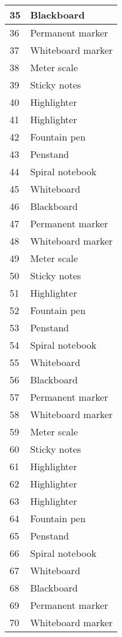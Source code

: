 \documentclass{article}
\begin{document}
\begin{longtable}{|l|l|}
		\hline
		35 & Blackboard \\
		\hline
		36 & Permanent marker \\
		\hline
		37 & Whiteboard marker \\
		\hline
		38 & Meter scale \\
		\hline
		39 & Sticky notes \\
		\hline
		40 & Highlighter \\
		\hline
		41 & Highlighter \\
		\hline
		42 & Fountain pen \\
		\hline
		43 & Penstand \\
		\hline
		44 & Spiral notebook \\
		\hline
		45 & Whiteboard \\
		\hline
		46 & Blackboard \\
		\hline
		47 & Permanent marker \\
		\hline
		48 & Whiteboard marker \\
		\hline
		49 & Meter scale \\
		\hline
		50 & Sticky notes \\
		\hline
		51 & Highlighter \\
		\hline
		52 & Fountain pen \\
		\hline
		53 & Penstand \\
		\hline
		54 & Spiral notebook \\
		\hline
		55 & Whiteboard \\
		\hline
		56 & Blackboard \\
		\hline
		57 & Permanent marker \\
		\hline
		58 & Whiteboard marker \\
		\hline
		59 & Meter scale \\
		\hline
		60 & Sticky notes \\
		\hline
		61 & Highlighter \\
		\hline
		62 & Highlighter \\
		\hline
		63 & Highlighter \\
		\hline
		64 & Fountain pen \\
		\hline
		65 & Penstand \\
		\hline
		66 & Spiral notebook \\
		\hline
		67 & Whiteboard \\
		\hline
		68 & Blackboard \\
		\hline
		69 & Permanent marker \\
		\hline
		70 & Whiteboard marker \\

\end{longtable}
\end{document}
